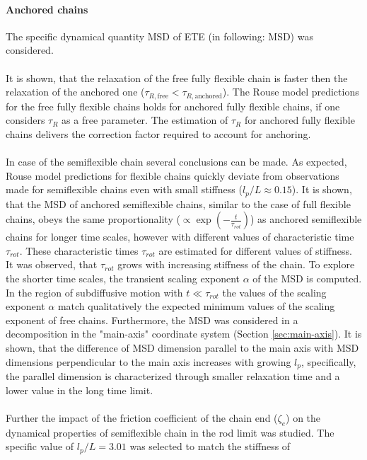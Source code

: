 \documentclass[
    paper=A4,pagesize=automedia,fontsize=12pt,
    BCOR=15mm,DIV=22,
    twoside,headinclude,footinclude=false,
    fleqn,             %
    bibliography=totocnumbered,          %
    listof=totoc,                %
    listof=flat,                 %
    cleardoublepage=empty      %
    numbers=endperiod
]{scrartcl}
\begin{document}
\paragraph{Anchored chains}
The specific dynamical quantity MSD of ETE (in following: MSD) was considered.
\\
\\
It is shown,
that the relaxation of the free fully flexible chain is faster then the relaxation of the
anchored one ($\tau_{R,\text{free}} < \tau_{R,\text{anchored}}$). The Rouse model predictions
for the free fully flexible chains holds for anchored fully flexible chains, if one considers
$\tau_R$ as a free parameter. The estimation of $\tau_R$ for anchored fully flexible chains 
delivers the correction factor required to account for anchoring.
\\
\\
In case of the semiflexible chain several conclusions can be made. As expected,
Rouse model predictions for flexible chains quickly deviate from observations made 
for semiflexible chains even with small stiffness ($l_p/L \approx 0.15$).
It is shown, that the MSD of anchored semiflexible chains, 
similar to the case of full flexible chains, obeys the same 
proportionality ($\propto \exp\left(-\frac{t}{\tau_{rot}}\right)$) 
as anchored semiflexible chains for longer time scales, however with
different values of characteristic time $\tau_{rot}$. These characteristic times 
$\tau_{rot}$ are estimated for different values of stiffness. It was observed, that 
$\tau_{rot}$ grows with increasing stiffness of the chain. To explore the shorter time
scales, the transient scaling exponent $\alpha$ of the MSD is computed. 
In the region of subdiffusive 
motion with $t\ll\tau_{rot}$ the values of the scaling exponent $\alpha$ match
qualitatively the expected minimum values of the scaling exponent of free chains.
Furthermore, the MSD was considered in a decomposition in the "main-axis" coordinate 
system (Section \ref{sec:main-axis}). It is shown, that the difference of MSD dimension parallel
to the main axis with MSD dimensions perpendicular to the main axis 
increases with growing $l_p$, specifically, the parallel dimension is 
characterized through smaller relaxation time and a lower value in the long time limit.
\\
\\
Further the impact of the friction coefficient of the chain end ($\zeta_e$) 
on the dynamical properties of semiflexible chain in the rod limit was studied.
The specific value of $l_p/L=3.01$ was selected to match the stiffness of
\end{document}
